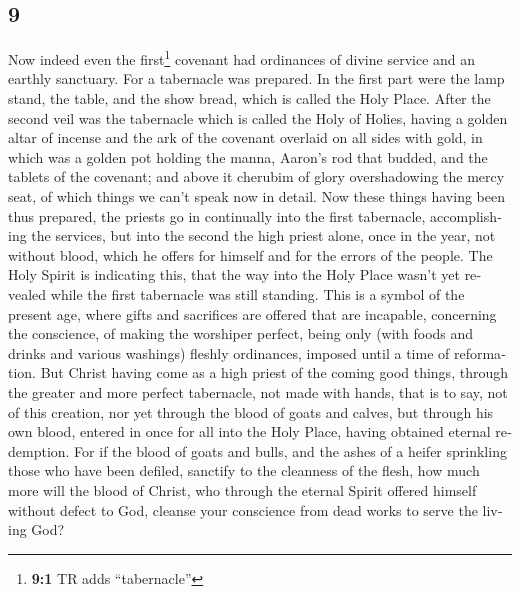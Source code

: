 \begin{paracol}{2}
\begin{otherlanguage}{english}
\hypertarget{section-17}{%
\section{9}\label{section-17}}

 Now indeed even the first\footnote{\textbf{9:1} TR adds
  ``tabernacle''} covenant had ordinances of divine service and an
earthly sanctuary.  For a tabernacle was prepared. In the
first part were the lamp stand, the table, and the show bread, which is
called the Holy Place.  After the second veil was the
tabernacle which is called the Holy of Holies,  having a
golden altar of incense and the ark of the covenant overlaid on all
sides with gold, in which was a golden pot holding the manna, Aaron's
rod that budded, and the tablets of the covenant;  and
above it cherubim of glory overshadowing the mercy seat, of which things
we can't speak now in detail.  Now these things having
been thus prepared, the priests go in continually into the first
tabernacle, accomplishing the services,  but into the
second the high priest alone, once in the year, not without blood, which
he offers for himself and for the errors of the people. 
The Holy Spirit is indicating this, that the way into the Holy Place
wasn't yet revealed while the first tabernacle was still standing.
 This is a symbol of the present age, where gifts and
sacrifices are offered that are incapable, concerning the conscience, of
making the worshiper perfect,  being only (with foods and
drinks and various washings) fleshly ordinances, imposed until a time of
reformation.  But Christ having come as a high priest of
the coming good things, through the greater and more perfect tabernacle,
not made with hands, that is to say, not of this creation,
 nor yet through the blood of goats and calves, but
through his own blood, entered in once for all into the Holy Place,
having obtained eternal redemption.  For if the blood of
goats and bulls, and the ashes of a heifer sprinkling those who have
been defiled, sanctify to the cleanness of the flesh, 
how much more will the blood of Christ, who through the eternal Spirit
offered himself without defect to God, cleanse your conscience from dead
works to serve the living God?

\hypertarget{christ-as-mediator-of-a-new-covenant-and-his-unique-sacrificial-death-as-the-eternal-means-of-his-heavenly-service-as-high-priest}{%
}
\end{otherlanguage}
\end{paracol}
